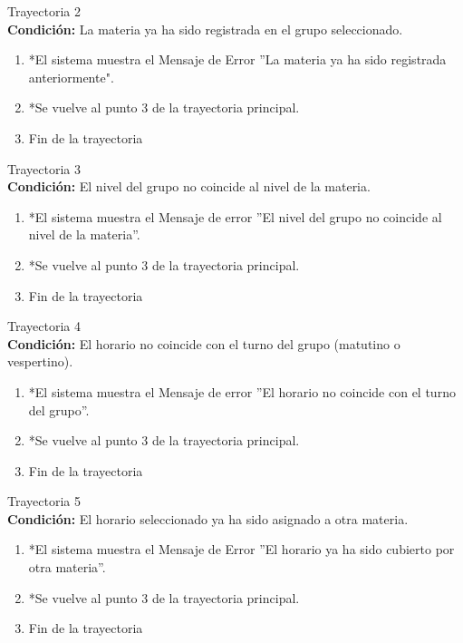 		\large{Trayectoria 2}\\
		\textbf{Condición:} La materia ya ha sido registrada en el grupo seleccionado.
		\begin{enumerate}
			\item *El sistema muestra el Mensaje de Error ''La materia ya ha sido registrada anteriormente".
			\item *Se vuelve al punto 3 de la trayectoria principal.
			\item Fin de la trayectoria
		\end{enumerate}
		\large{Trayectoria 3}\\
		\textbf{Condición:} El nivel del grupo no coincide al nivel de la materia.
		\begin{enumerate}
			\item *El sistema muestra el Mensaje de error ''El nivel del grupo no coincide al nivel de la materia''.
			\item *Se vuelve al punto 3 de la trayectoria principal.
			\item Fin de la trayectoria
		\end{enumerate}
		\large{Trayectoria 4}\\
		\textbf{Condición:} El horario no coincide con el turno del grupo (matutino o vespertino).
		\begin{enumerate}
			\item *El sistema muestra el 	Mensaje de error ''El horario no coincide con el turno del grupo''.
			\item *Se vuelve al punto 3 de la trayectoria principal.
			\item Fin de la trayectoria
		\end{enumerate}
		\large{Trayectoria 5}\\
		\textbf{Condición:} El horario seleccionado ya ha sido asignado a otra materia.
		\begin{enumerate}
			\item *El sistema muestra el Mensaje de Error ''El horario ya ha sido cubierto por otra materia''.
			\item *Se vuelve al punto 3 de la trayectoria principal.
			\item Fin de la trayectoria
		\end{enumerate}